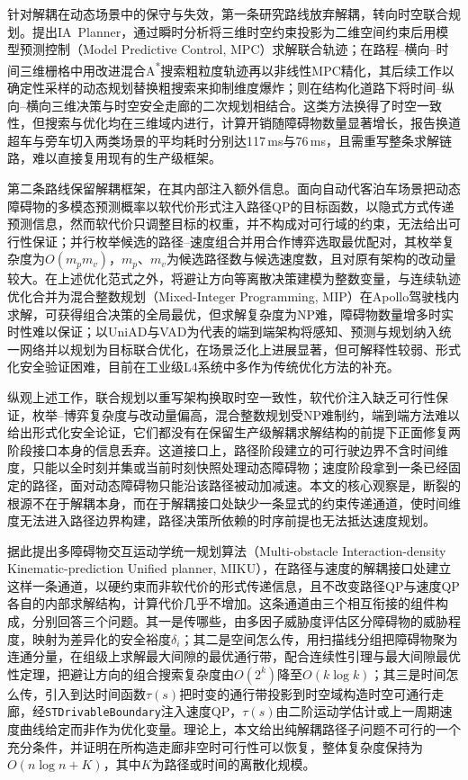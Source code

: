 \documentclass[a4paper,zihao=5]{ctexart}
\theoremstyle{definition}
\begin{document}
针对解耦在动态场景中的保守与失效，第一条研究路线放弃解耦，转向时空联合规划。\citet{yang2021_ia_planner}提出IA~Planner，通过瞬时分析将三维时空约束投影为二维空间约束后用模型预测控制（Model Predictive Control, MPC）求解联合轨迹；\citet{hu2023_hybrid_astar_slt}在路程--横向--时间三维栅格中用改进混合A\textsuperscript{*}搜索粗粒度轨迹再以非线性MPC精化，其后续工作\citep{hu2025_dp_nmpc}以确定性采样的动态规划替换粗搜索来抑制维度爆炸；\citet{qiao2025stjoint}则在结构化道路下将时间--纵向--横向三维决策与时空安全走廊的二次规划相结合。这类方法换得了时空一致性，但搜索与优化均在三维域内进行，计算开销随障碍物数量显著增长，\citet{hu2023_hybrid_astar_slt}报告换道超车与旁车切入两类场景的平均耗时分别达117\,ms与76\,ms，且需重写整条求解链路，难以直接复用现有的生产级框架。

第二条路线保留解耦框架，在其内部注入额外信息。\citet{han2026_contingency}面向自动代客泊车场景把动态障碍物的多模态预测概率以软代价形式注入路径QP的目标函数，以隐式方式传递预测信息，然而软代价只调整目标的权重，并不构成对可行域的约束，无法给出可行性保证；\citet{zhang2023_dp_rcg}并行枚举候选的路径--速度组合并用合作博弈选取最优配对，其枚举复杂度为$O(m_p m_v)$，$m_p$、$m_v$为候选路径数与候选速度数，且对原有架构的改动量较大。在上述优化范式之外，\citet{kessler2023}将避让方向等离散决策建模为整数变量，与连续轨迹优化合并为混合整数规划（Mixed-Integer Programming, MIP）在Apollo驾驶栈内求解，可获得组合决策的全局最优，但求解复杂度为NP难，障碍物数量增多时实时性难以保证；以UniAD\citep{hu2023uniad}与VAD\citep{jiang2023vad}为代表的端到端架构将感知、预测与规划纳入统一网络并以规划为目标联合优化\citep{li2024decision,zhang2018autonomous}，在场景泛化上进展显著，但可解释性较弱、形式化安全验证困难，目前在工业级L4系统中多作为传统优化方法的补充。

纵观上述工作，联合规划以重写架构换取时空一致性，软代价注入缺乏可行性保证，枚举--博弈复杂度与改动量偏高，混合整数规划受NP难制约，端到端方法难以给出形式化安全论证，它们都没有在保留生产级解耦求解结构的前提下正面修复两阶段接口本身的信息丢弃。这道接口上，路径阶段建立的可行驶边界不含时间维度，只能以全时刻并集或当前时刻快照处理动态障碍物；速度阶段拿到一条已经固定的路径，面对动态障碍物只能沿该路径被动加减速。本文的核心观察是，断裂的根源不在于解耦本身，而在于解耦接口处缺少一条显式的约束传递通道，使时间维度无法进入路径边界构建，路径决策所依赖的时序前提也无法抵达速度规划。

据此提出多障碍物交互运动学统一规划算法（Multi-obstacle Interaction-density Kinematic-prediction Unified planner, MIKU），在路径与速度的解耦接口处建立这样一条通道，以硬约束而非软代价的形式传递信息，且不改变路径QP与速度QP各自的内部求解结构，计算代价几乎不增加。这条通道由三个相互衔接的组件构成，分别回答三个问题。其一是传哪些，由多因子威胁度评估区分障碍物的威胁程度，映射为差异化的安全裕度$\delta_i$；其二是空间怎么传，用扫描线分组把障碍物聚为连通分量，在组级上求解最大间隙的最优通行带，配合连续性引理与最大间隙最优性定理，把避让方向的组合搜索复杂度由$O(2^k)$降至$O(k\log k)$；其三是时间怎么传，引入到达时间函数$\tau(s)$把时变的通行带投影到时空域构造时空可通行走廊，经\texttt{STDrivableBoundary}注入速度QP，$\tau(s)$由二阶运动学估计或上一周期速度曲线给定而非作为优化变量。理论上，本文给出纯解耦路径子问题不可行的一个充分条件，并证明在所构造走廊非空时可行性可以恢复，整体复杂度保持为$O(n\log n + K)$，其中$K$为路径或时间的离散化规模。
\end{document}

